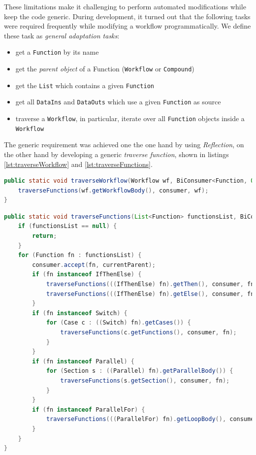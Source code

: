 \documentclass[a4paper,12pt,pdftex,halfparskip,cleardoubleempty,bibtotoc,liststotoc]{scrbook}
\begin{document}
These limitations make it challenging to perform automated modifications while keep the code generic.
During development, it turned out that the following tasks were required frequently while modifying a workflow programmatically. We define these task  as \textit{general adaptation tasks}:
\begin{itemize}
	\item get a \texttt{Function} by its name
	\item get the \textit{parent object} of a Function (\texttt{Workflow} or \texttt{Compound})
	\item get the \texttt{List} which contains a given \texttt{Function}
	\item get all \texttt{DataIns} and \texttt{DataOuts} which use a given \texttt{Function} as source
	\item traverse a \texttt{Workflow}, in particular, iterate over all \texttt{Function} objects inside a \texttt{Workflow}
\end{itemize}

The generic requirement was achieved one the one hand by using \textit{Reflection}, on the other hand by developing a generic \textit{traverse function}, shown in listings \ref{lst:traverseWorkflow} and \ref{lst:traverseFunctions}.

\begin{lstlisting}[language=Java,caption={Traverse workflow},label={lst:traverseWorkflow}]
public static void traverseWorkflow(Workflow wf, BiConsumer<Function, Object> consumer) {
    traverseFunctions(wf.getWorkflowBody(), consumer, wf);
}
\end{lstlisting}

\begin{lstlisting}[language=Java,caption={Traverse functions},label={lst:traverseFunctions}]
public static void traverseFunctions(List<Function> functionsList, BiConsumer<Function, Object> consumer, Object currentParent) {
    if (functionsList == null) {
        return;
    }
    for (Function fn : functionsList) {
        consumer.accept(fn, currentParent);
        if (fn instanceof IfThenElse) {
            traverseFunctions(((IfThenElse) fn).getThen(), consumer, fn);
            traverseFunctions(((IfThenElse) fn).getElse(), consumer, fn);
        }
        if (fn instanceof Switch) {
            for (Case c : ((Switch) fn).getCases()) {
                traverseFunctions(c.getFunctions(), consumer, fn);
            }
        }
        if (fn instanceof Parallel) {
            for (Section s : ((Parallel) fn).getParallelBody()) {
                traverseFunctions(s.getSection(), consumer, fn);
            }
        }
        if (fn instanceof ParallelFor) {
            traverseFunctions(((ParallelFor) fn).getLoopBody(), consumer, fn);
        }
    }
}
\end{lstlisting}
\end{document}
